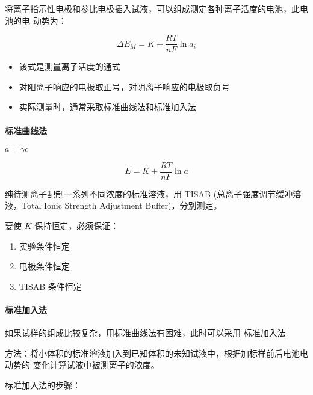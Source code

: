 将离子指示性电极和参比电极插入试液，可以组成测定各种离子活度的电池，此电池的电
动势为：

\begin{equation}
    \Delta E_{M} = K \pm \frac{RT}{nF} \ln a_i
\end{equation}

\begin{itemize}
    \item 该式是测量离子活度的通式
    \item 对阳离子响应的电极取正号，对阴离子响应的电极取负号
    \item 实际测量时，通常采取标准曲线法和标准加入法
\end{itemize}


\paragraph{标准曲线法} $a = \gamma c$

\begin{equation}
    E = K \pm \frac{RT}{nF} \ln a
\end{equation}

纯待测离子配制一系列不同浓度的标准溶液，用 TISAB (总离子强度调节缓冲溶液，Total
Ionic Strength Adjustment Buffer)，分别测定。

要使 $K$ 保持恒定，必须保证：

\begin{enumerate}
    \item 实验条件恒定
    \item 电极条件恒定
    \item TISAB 条件恒定
\end{enumerate}

\paragraph{标准加入法} 如果试样的组成比较复杂，用标准曲线法有困难，此时可以采用
标准加入法

方法：将小体积的标准溶液加入到已知体积的未知试液中，根据加标样前后电池电动势的
变化计算试液中被测离子的浓度。

标准加入法的步骤：

